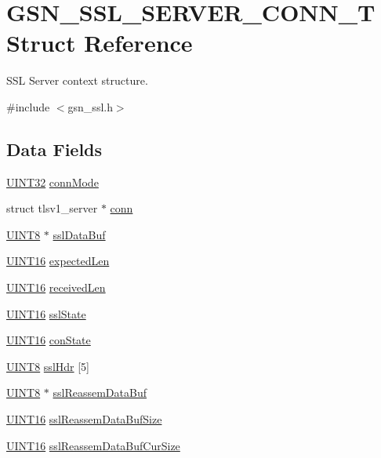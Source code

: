 \hypertarget{a00245}{
\section{GSN\_\-SSL\_\-SERVER\_\-CONN\_\-T Struct Reference}
\label{a00245}
}


SSL Server context structure.  




{\ttfamily \#include $<$gsn\_\-ssl.h$>$}

\subsection*{Data Fields}
\begin{DoxyCompactItemize}
\item 
\hyperlink{a00660_gae1e6edbbc26d6fbc71a90190d0266018}{UINT32} \hyperlink{a00245_aeff852947f5fd4b9b609d3ef04ebe22a}{connMode}
\item 
struct tlsv1\_\-server $\ast$ \hyperlink{a00245_a7ae31f38c448c24fedca2e2980a87058}{conn}
\item 
\hyperlink{a00660_gab27e9918b538ce9d8ca692479b375b6a}{UINT8} $\ast$ \hyperlink{a00245_afda235c301c31cb0d68392b799e27293}{sslDataBuf}
\item 
\hyperlink{a00660_ga09f1a1fb2293e33483cc8d44aefb1eb1}{UINT16} \hyperlink{a00245_a1a40ca49a468072350c826dc4132855a}{expectedLen}
\item 
\hyperlink{a00660_ga09f1a1fb2293e33483cc8d44aefb1eb1}{UINT16} \hyperlink{a00245_a8ad381330a4d477907ef368e97af5780}{receivedLen}
\item 
\hyperlink{a00660_ga09f1a1fb2293e33483cc8d44aefb1eb1}{UINT16} \hyperlink{a00245_a51862f5394c213c6b8ffaa502455d403}{sslState}
\item 
\hyperlink{a00660_ga09f1a1fb2293e33483cc8d44aefb1eb1}{UINT16} \hyperlink{a00245_acb69cb3fa328edc1fb385aa446668bdd}{conState}
\item 
\hyperlink{a00660_gab27e9918b538ce9d8ca692479b375b6a}{UINT8} \hyperlink{a00245_acb9f7b08bd949dbbea3819d3c24b4524}{sslHdr} \mbox{[}5\mbox{]}
\item 
\hyperlink{a00660_gab27e9918b538ce9d8ca692479b375b6a}{UINT8} $\ast$ \hyperlink{a00245_a7d1ac9fb7decb2b92096b4d1bf688c56}{sslReassemDataBuf}
\item 
\hyperlink{a00660_ga09f1a1fb2293e33483cc8d44aefb1eb1}{UINT16} \hyperlink{a00245_a74c1a364bfc6690c798543c316088c1b}{sslReassemDataBufSize}
\item 
\hyperlink{a00660_ga09f1a1fb2293e33483cc8d44aefb1eb1}{UINT16} \hyperlink{a00245_a5b80cbb76c258b69ef230d9a17e978ac}{sslReassemDataBufCurSize}
\end{DoxyCompactItemize}


